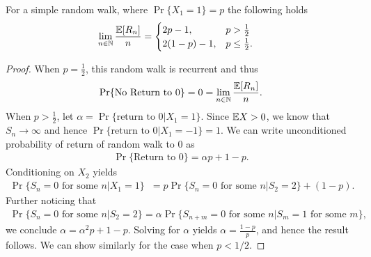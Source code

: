 \documentclass[a4paper,10pt,english]{article}
\begin{document}
\begin{thm} For a simple random walk, where $\Pr\{X_1 = 1\} = p$ the following holds
\begin{align*}
\lim_{n \in \mathbb{N}}\frac{\mathbb{E}[R_n]}{n} &= 
	\begin{cases}
2p - 1, & p > \frac{1}{2}\\
2(1-p)-1, & p \leq \frac{1}{2}.
	\end{cases}
\end{align*}
\end{thm}
\begin{proof}
When $p=\frac{1}{2}$, this random walk is recurrent and thus
\begin{align*}
\Pr\{\text{No Return to }0\} = 0 = \lim_{n \in \mathbb{N}} \frac{\mathbb{E}[R_n]}{n}.
\end{align*}
When $p > \frac{1}{2}$, let $\alpha = \Pr\{\text{return to } 0|X_1 = 1\}$. Since $\mathbb{E} X > 0$, we know that $S_n \to \infty$ and hence $\Pr\{\text{return to } 0|X_1 = -1\} = 1$. We can write unconditioned probability of return of random walk to $0$ as 
\begin{align*}
\Pr\{\text{Return to }0\} = \alpha p+ 1-p.
\end{align*}
Conditioning on $X_2$ yields 
\begin{align*}
\Pr\{S_n = 0 \text{ for some }n|X_1 = 1\} &= p\Pr\{S_n = 0 \text{ for some }n| S_2  = 2\}  + (1-p).
\end{align*}
Further noticing that 
\begin{align*}
\Pr\{S_n = 0 \text{ for some }n| S_2  = 2\} &= \alpha \Pr\{S_{n+m} = 0 \text{ for some }n| S_m = 1 \text{ for some }m \},
\end{align*}
we conclude $\alpha = \alpha^2 p + 1-p$. 
Solving for $\alpha$ yields $\alpha = \frac{1-p}{p}$, and hence the result follows. We can show similarly for the case when $p < 1/2$.
\end{proof}
\end{document}

